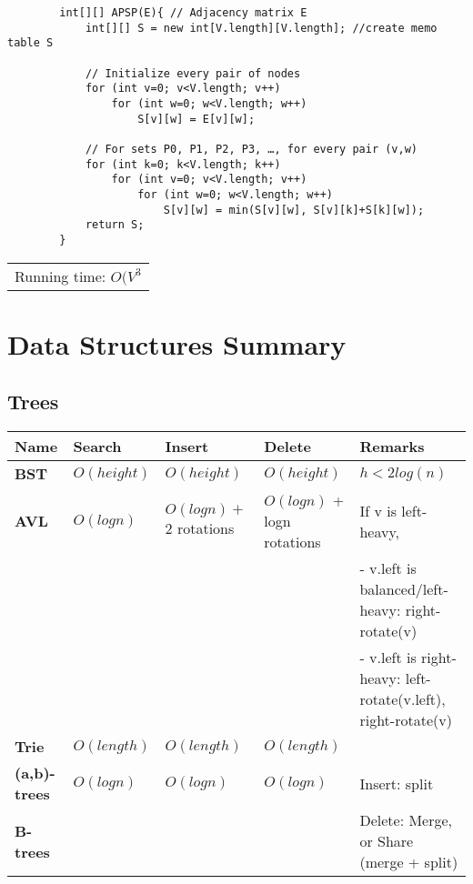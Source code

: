 \documentclass{article}
\begin{document}
    \begin{verbatim}
        int[][] APSP(E){ // Adjacency matrix E
            int[][] S = new int[V.length][V.length]; //create memo table S

            // Initialize every pair of nodes
            for (int v=0; v<V.length; v++)
                for (int w=0; w<V.length; w++)
                    S[v][w] = E[v][w];

            // For sets P0, P1, P2, P3, …, for every pair (v,w)
            for (int k=0; k<V.length; k++)
                for (int v=0; v<V.length; v++)
                    for (int w=0; w<V.length; w++)
                        S[v][w] = min(S[v][w], S[v][k]+S[k][w]);
            return S;
        }
    \end{verbatim}

    \begin{tabular}{l}
        Running time: $O(V^{3}$\\
    \end{tabular}


    \pagebreak

    \section{Data Structures Summary}

    \subsection{Trees}

    \noindent\begin{tabular}{|l|l|l|l|p{5cm}|}
        \toprule
        \textbf{Name} & \textbf{Search} & \textbf{Insert} & \textbf{Delete} & \textbf{Remarks}\\
        \midrule
        \midrule
        \textbf{BST} & $O(height)$ & $O(height)$ & $O(height)$ & $h < 2log(n)$\\
        \midrule
        \textbf{AVL} & $O(logn)$ & $O(logn) +$ 2 rotations & $O(logn)$ + logn rotations & If v is left-heavy,\\
        &&&&- v.left is balanced/left-heavy: right-rotate(v)\\
        &&&&- v.left is right-heavy: left-rotate(v.left), right-rotate(v)\\
        \midrule
        \textbf{Trie} & $O(length)$ & $O(length)$& $O(length)$ &\\
        \midrule
        \textbf{(a,b)-trees} & $O(logn)$ & $O(logn)$ & $O(logn)$ & Insert: split\\
        \textbf{B-trees} &&&& Delete: Merge, or Share (merge + split)\\
        \bottomrule
    \end{tabular}
\end{document}

